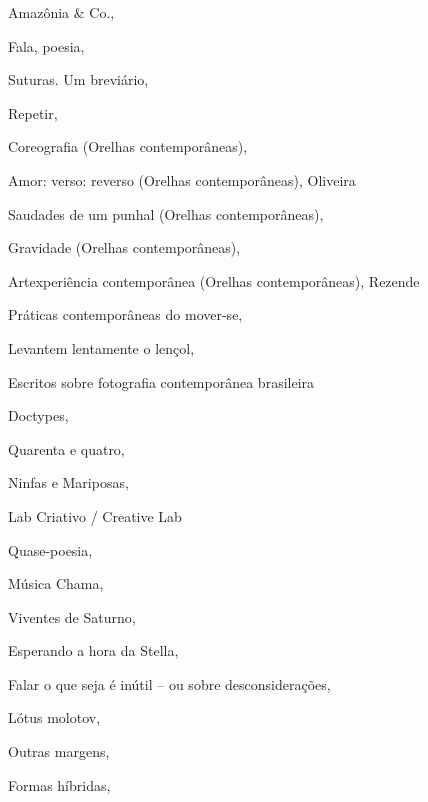 \begin{multicols}{2}
\begin{enumerate}
{\item Amazônia \& Co., {}
\item Fala, poesia, {}
\item Suturas. Um breviário, {}
\item Repetir, {}
\item Coreografia (Orelhas contemporâneas), {}
\item Amor: verso: reverso (Orelhas contemporâneas), {}Oliveira
\item Saudades de um punhal (Orelhas contemporâneas), {}
\item Gravidade (Orelhas contemporâneas), {}
\item Artexperiência contemporânea (Orelhas contemporâneas), {}Rezende
\item Práticas contemporâneas do mover-se, {}
\item Levantem lentamente o lençol, {}
\item Escritos sobre fotografia contemporânea brasileira
\item Doctypes, {}
\item Quarenta e quatro, {}
\item Ninfas e Mariposas, {}
\item Lab Criativo / Creative Lab
\item Quase-poesia, {}
\item Música Chama, {}
\item Viventes de Saturno, {}
\item Esperando a hora da Stella, {}
\item Falar o que seja é inútil – ou sobre desconsiderações, {}
\item Lótus molotov, {}
\item Outras margens, {}
\item Formas híbridas, {}
}
\end{enumerate}
\end{multicols}
